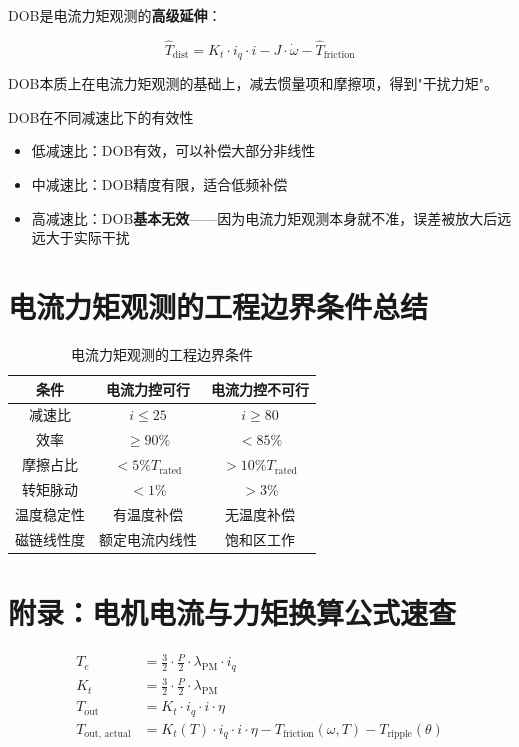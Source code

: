 DOB是电流力矩观测的\textbf{高级延伸}：

\begin{equation}
\hat{T}_{\text{dist}} = K_t \cdot i_q \cdot i - J \cdot \dot{\omega} - \hat{T}_{\text{friction}}
\end{equation}

DOB本质上在电流力矩观测的基础上，减去惯量项和摩擦项，得到"干扰力矩"。

\begin{engineeringbox}{DOB在不同减速比下的有效性}
\begin{itemize}
  \item 低减速比：DOB有效，可以补偿大部分非线性
  \item 中减速比：DOB精度有限，适合低频补偿
  \item 高减速比：DOB\textbf{基本无效}——因为电流力矩观测本身就不准，误差被放大后远远大于实际干扰
\end{itemize}
\end{engineeringbox}

\section{电流力矩观测的工程边界条件总结}

\begin{table}[H]
\centering
\begin{tabular}{c|c|c}
\toprule
\textbf{条件} & \textbf{电流力控可行} & \textbf{电流力控不可行} \\
\midrule
减速比 & $i \leq 25$ & $i \geq 80$ \\
效率 & $\geq 90\%$ & $< 85\%$ \\
摩擦占比 & $< 5\% T_{\text{rated}}$ & $> 10\% T_{\text{rated}}$ \\
转矩脉动 & $< 1\%$ & $> 3\%$ \\
温度稳定性 & 有温度补偿 & 无温度补偿 \\
磁链线性度 & 额定电流内线性 & 饱和区工作 \\
\bottomrule
\end{tabular}
\caption{电流力矩观测的工程边界条件}
\label{tab:current_torque_boundary}
\end{table}

\section*{附录：电机电流与力矩换算公式速查}

\begin{align}
T_e &= \frac{3}{2} \cdot \frac{P}{2} \cdot \lambda_{\text{PM}} \cdot i_q \label{eq:tq1} \\
K_t &= \frac{3}{2} \cdot \frac{P}{2} \cdot \lambda_{\text{PM}} \label{eq:kt1} \\
T_{\text{out}} &= K_t \cdot i_q \cdot i \cdot \eta \label{eq:tout1} \\
T_{\text{out, actual}} &= K_t(T) \cdot i_q \cdot i \cdot \eta - T_{\text{friction}}(\omega, T) - T_{\text{ripple}}(\theta) \label{eq:tactual1}
\end{align}

